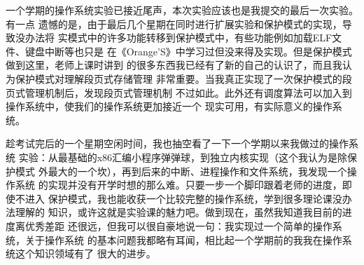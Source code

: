 \documentclass[12pt,a4paper,UTF8]{ctexart}
\begin{document}
\begin{figure}[htbp]
\centering
{}
\end{figure}

一个学期的操作系统实验已接近尾声，本次实验应该也是我提交的最后一次实验。有一点
遗憾的是，由于最后几个星期在同时进行扩展实验和保护模式的实现，导致没办法将
实模式中的许多功能转移到保护模式中，有些功能例如加载ELF文件、键盘中断等也只是
在《Orange'S》中学习过但没来得及实现。但是保护模式做到这里，老师上课时讲到
的很多东西我已经有了新的自己的认识了，而且我认为保护模式对理解段页式存储管理
非常重要。当我真正实现了一次保护模式的段页式管理机制后，发现段页式管理机制
不过如此。此外还有调度算法可以加入到操作系统中，使我们的操作系统更加接近一个
现实可用，有实际意义的操作系统。

趁考试完后的一个星期空闲时间，我也抽空看了一下一个学期以来我做过的操作系统
实验：从最基础的x86汇编小程序弹弹球，到独立内核实现（这个我认为是除保护模式
外最大的一个坎），再到后来的中断、进程操作和文件系统，我发现一个操作系统
的实现并没有开学时想的那么难。只要一步一个脚印跟着老师的进度，即使不进入
保护模式，我也能收获一个比较完整的操作系统，学到很多理论课没办法理解的
知识，或许这就是实验课的魅力吧。做到现在，虽然我知道我目前的进度离优秀差距
还很远，但我可以很自豪地说一句：我实现过一个简单的操作系统，关于操作系统
的基本问题我都略有耳闻，相比起一个学期前的我我在操作系统这个知识领域有了
很大的进步。
\end{document}
